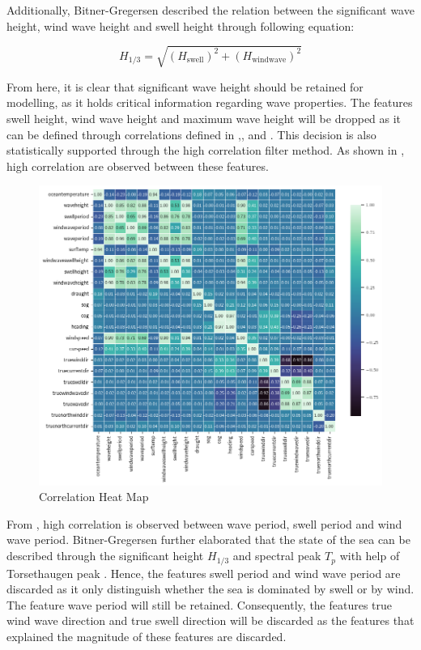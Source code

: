 Additionally, Bitner-Gregersen \cite{BitnerGregersen.2005} described the relation between the significant wave height, wind wave height and swell height through following equation:

\begin{equation}\label{eqn:H_sig_root}
    H_{1/3} = \sqrt{(H_{\text{swell}})^2 + (H_{\text{windwave}})^2} 
\end{equation}

From here, it is clear that significant wave height should be retained for modelling, as it holds critical information regarding wave properties. The features swell height, wind wave height and maximum wave height will be dropped as it can be defined through correlations defined in ,, and . This decision is also statistically supported through the high correlation filter method. As shown in , high correlation are observed between these features.\\

\begin{figure}
    \centering
    \includegraphics[width=.9\linewidth,height=.9\textheight,keepaspectratio]{02_figures/heatmap_corr_ovr.png}
    \caption{Correlation Heat Map}
    \label{fig:heatmap_ovr}
\end{figure}

From , high correlation is observed between wave period, swell period and wind wave period. Bitner-Gregersen further elaborated that the state of the sea can be described through the significant height $H_{1/3}$ and spectral peak $T_p$ with help of Torsethaugen peak \cite{K.Torsethaugen.2004}. Hence, the features swell period and wind wave period are discarded as it only distinguish whether the sea is dominated by swell or by wind. The feature wave period will still be retained. Consequently, the features true wind wave direction and true swell direction will be discarded as the features that explained the magnitude of these features are discarded.\\

